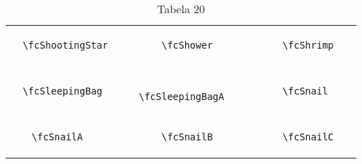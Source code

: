 \documentclass[x11names]{article}
\begin{document}
\begin{table}[H]
\begin{tabular}{|c|c|c|c|c|c|}
		&\multirow{5}{*}{	\fcShootingStar	[scale=0.6]} & &\multirow{5}{*}{	\fcShower	[scale=0.4]} & &\multirow{5}{*}{	\fcShrimp	[scale=0.4]}\\	& & & & & \\	& & & & & \\	\verb|	\fcShootingStar	| & & \verb|	\fcShower	| & & \verb|	\fcShrimp	| & \\	& & & & & \\	& & & & & \\	& & & & & \\	\hline									
		&\multirow{5}{*}{	\fcSleepingBag	[scale=0.4]} & &\multirow{5}{*}{	\fcSleepingBagA	[scale=0.4]} & &\multirow{5}{*}{	\fcSnail	[scale=0.4]}\\	& & & & & \\	& & & & & \\	\verb|	\fcSleepingBag	| & & \verb|	\fcSleepingBagA	| & & \verb|	\fcSnail	| & \\	& & & & & \\	& & & & & \\	& & & & & \\	\hline									
		&\multirow{5}{*}{	\fcSnailA	[scale=0.4]} & &\multirow{5}{*}{	\fcSnailB	[scale=0.4]} & &\multirow{5}{*}{	\fcSnailC	[scale=0.4]}\\	& & & & & \\	& & & & & \\	\verb|	\fcSnailA	| & & \verb|	\fcSnailB	| & & \verb|	\fcSnailC	| & \\	& & & & & \\	& & & & & \\	& & & & & \\		\hline 	\hline 	\end{tabular}	\caption{	Tabela 20	}\label{	Tab20	}\end{table}
\end{document}
